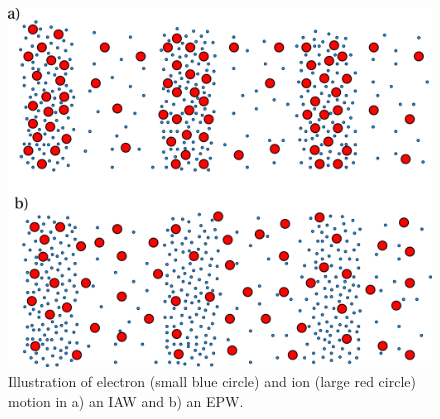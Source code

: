 \begin{figure}[t!]
    \includegraphics[width=0.7\linewidth]{Theory/Images/IAW_EPW.png}
    \centering
    \caption{Illustration of electron (small blue circle) and ion (large red circle) motion in a) an \ac{IAW} and b) an \ac{EPW}.}%
    \label{fig:theory_IAW_EPW}
\end{figure}

